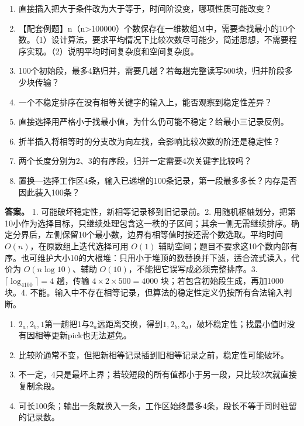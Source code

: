 \begin{enumerate}
\def\labelenumi{\arabic{enumi}.}
\item
  直接插入把大于条件改为大于等于，时间阶没变，哪项性质可能改变？
\item
  【配套例题】n（n\textgreater100000）个数保存在一维数组M中，需要查找最小的10个数。（1）设计算法，要求平均情况下比较次数尽可能少，简述思想，不需要程序实现。（2）说明平均时间复杂度和空间复杂度。
\item
  100个初始段，最多4路归并，需要几趟？若每趟完整读写500块，归并阶段多少块传输？
\item
  一个不稳定排序在没有相等关键字的输入上，能否观察到稳定性差异？
\item
  直接选择用严格小于找最小值，为什么仍可能不稳定？给最小三记录反例。
\item
  折半插入将相等时的分支改为向左找，会影响比较次数的阶还是稳定性？
\item
  两个长度分别为2、3的有序段，归并一定需要4次关键字比较吗？
\item
  置换---选择工作区4条，输入已递增的100条记录，第一段最多多长？内存是否因此装入100条？
\end{enumerate}

\textbf{答案。} 1. 可能破坏稳定性，新相等记录移到旧记录前。2. 用随机枢轴划分，把第10小作为选择目标，只继续处理包含这一秩的子区间；其余一侧无需继续排序。确定分界后，左侧保留10个最小数，边界有相等值时按还需个数选取。平均时间 \(O(n)\)，在原数组上迭代选择可用 \(O(1)\) 辅助空间；题目不要求这10个数内部有序。也可维护大小10的大根堆：只用小于堆顶的数替换并下滤，适合流式读入，代价为 \(O(n\log10)\)、辅助 \(O(10)\)，不能把它误写成必须完整排序。3. \(\lceil\log_4100\rceil=4\) 趟，传输 \(4\times2\times500=4000\) 块；若包含初始段生成，再加1000块。4. 不能。输入中不存在相等记录，但算法的稳定性定义仍按所有合法输入判断。

\begin{enumerate}
\def\labelenumi{\arabic{enumi}.}
\setcounter{enumi}{4}
\tightlist
\item
  \(2_a,2_b,1\)第一趟把1与\(2_a\)远距离交换，得到\(1,2_b,2_a\)，破坏稳定性；找最小值时没有因相等更新pick也无法避免。
\item
  比较阶通常不变，但把新相等记录插到旧相等记录之前，稳定性可能破坏。
\item
  不一定，4只是最坏上界；若较短段的所有值都小于另一段，只比较2次就直接复制余段。
\item
  可长100条；输出一条就换入一条，工作区始终最多4条，段长不等于同时驻留的记录数。
\end{enumerate}
